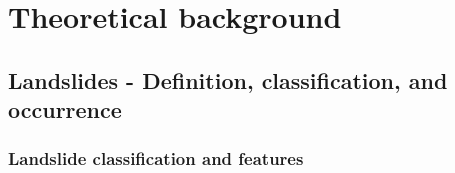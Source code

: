 \chapter{Theoretical background}
\section{Landslides - Definition, classification, and occurrence} 	
{\textcolor{red}{ \lipsum[1-2]}}
	
\subsection{Landslide classification and features} \label{landslides}
{\textcolor{red}{ \lipsum[1-2]}}\par


